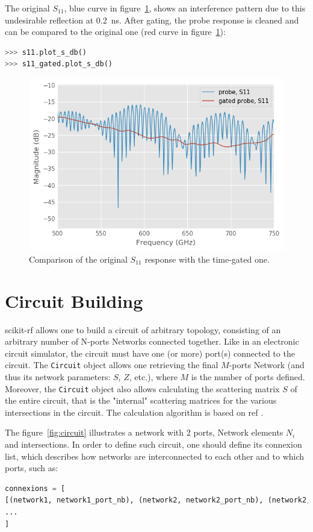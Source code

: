 \documentclass{IEEEjmw}
\begin{document}
The original $S_{11}$, blue curve in figure~\ref{fig:timedomain1}, shows an interference pattern due to this undesirable reflection at \SI{0.2}{\nano\second}. After gating, the probe response is cleaned and can be compared to the original one (red curve in figure~\ref{fig:timedomain1}):

\begin{lstlisting}[language=Python]
>>> s11.plot_s_db()
>>> s11_gated.plot_s_db()
\end{lstlisting}

\begin{figure}
	\centering
	\includegraphics[width=0.95\linewidth]{figures/gated1}
	\caption{Comparison of the original $S_{11}$ response with the time-gated one.}
	\label{fig:timedomain1}
\end{figure}


\section{Circuit Building}
scikit-rf allows one to build a circuit of arbitrary topology, consisting of an arbitrary number of N-ports Networks connected together. Like in an electronic circuit simulator, the circuit must have one (or more) port(s) connected to the circuit. The \texttt{Circuit} object allows one retrieving the final $M$-ports Network (and thus its network parameters: $S$, $Z$, etc.), where $M$ is the number of ports defined. Moreover, the \texttt{Circuit} object also allows calculating the scattering matrix $S$ of the entire circuit, that is the "internal" scattering matrices for the various intersections in the circuit. The calculation algorithm is based on ref \cite{hallbjorner2003}.

The figure~\ref{fig:circuit} illustrates a network with 2 ports, Network elements $N_i$ and intersections. In order to define such circuit, one should define its connexion list, which describes how networks are interconnected to each other and to which ports, such as:
\begin{lstlisting}[language=Python]
connexions = [
[(network1, network1_port_nb), (network2, network2_port_nb), (network2, network2_port_nb), ...], 
...
]
\end{lstlisting}
\end{document}

